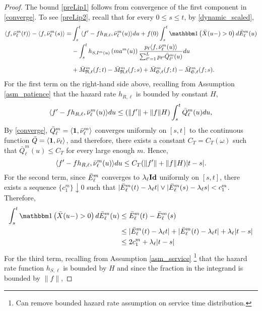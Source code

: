 \documentclass{article}
\theoremstyle{definition}
\numberwithin{equation}{section}
\begin{document}
\begin{proof}
The bound \eqref{preLip1} follows from convergence of the first component in \eqref{converge}. To see \eqref{preLip2}, recall that for every $0\leq s\leq t$, by \eqref{dynamic_scaled},
\begin{align}\label{temp_lip1}
    \langle f,\bnu^m_\ell(t) \rangle - \langle f,\bnu^m_\ell(s)\rangle =&   \int_s^t \langle f'-fh_{R,\ell},\bnu^m_\ell(u)\rangle du \notag + f(0)\int_s^t \indic{\bx(u-)>0} d \barrival^m_\ell(u)\\
    & - \int_s^t h_{S,\class^m(u)}\left(m\age^m(u)\right)\frac{\weight_\ell \langle f,\bnu^m_\ell(u)\rangle }{\sum_{\ell'=1}^L\weight_{\ell'}\bql^m_{\ell'}(u)} du \notag\\[2mm]
    &+  \bar M^m_{\mathfrak{R},\ell}(f;t)-\bar M^m_{\mathfrak{R},\ell}(f;s)+\bar M^m_{\mathfrak{S},\ell}(f;t)-\bar M^m_{\mathfrak{S},\ell}(f;s).
\end{align}
For the first term on the right-hand side above, recalling from Assumption \ref{asm_patience} that the hazard rate $h_{R,\ell}$ is bounded by constant $H$,
\[
\langle f'-fh_{R,\ell},\bar{\nu}^m_\ell(u)\rangle du \leq (\|f'\|+\|f\|H)\int_s^t \bar Q_\ell^m(u)du,
\]
By \eqref{converge}, $\bar Q_\ell^m=\langle \f1,\bar\nu_\ell^m\rangle$ converges uniformly on $[s,t]$ to the continuous function $\bar Q=\langle\f1,\bar\nu_\ell\rangle$, and therefore, there exists a constant $C_T=C_T(\omega)$ such that $\bar Q_\ell^m(u)\leq C_T$ for every large enough $m$. Hence,
\begin{equation}
  \langle f'-fh_{R,\ell},\bar{\nu}^m_\ell(u)\rangle du \leq C_T(\|f'\|+\|f\|H)|t-s|.
\end{equation}
For the second term, since $\bar E^m_\ell$ converges to $\lambda_\ell\textbf{Id}$ uniformly on $[s,t]$, there exists a sequence $\{c_1^m\} \downarrow0$ such that $|\bar E^m_\ell(t)-\lambda_\ell t|\vee|\bar E^m_\ell(s)-\lambda_\ell s|<c_1^m$. Therefore,
\begin{align}
\int_s^t \indic{\bx(u-)>0} d \barrival^m_\ell(u) & \leq \barrival^m_\ell(t)-\barrival^m_\ell(s) \notag\\
&\leq |\barrival^m_\ell(t)-\lambda_\ell t|+|\barrival^m_\ell(t)-\lambda_\ell t|+\lambda_\ell |t-s|\notag\\
&\leq 2c_1^m+\lambda_\ell|t-s|
\end{align}
For the third term, recalling from Assumption \ref{asm_service} \footnote{Can remove bounded hazard rate assumption on service time distribution.} that the hazard rate function $h_{S,\ell}$ is bounded by $H$ and since the fraction in the integrand is bounded by $\|f\|$,

\end{proof}
\end{document}
